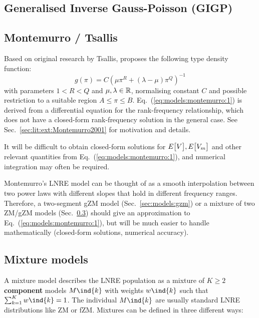 \documentclass[a4paper]{article}
\begin{document}
\subsection{Generalised Inverse Gauss-Poisson (GIGP)}
\label{sec:models:gigp}

\subsection{Montemurro / Tsallis}
\label{sec:models:montemurro}

Based on original research by Tsallis,  \citet{Montemurro:01} proposes the following type density function:
\begin{equation}
  \label{eq:models:montemurro:1}
  g(\pi) = C \left( \mu \pi^R + (\lambda - \mu) \pi^Q  \right)^{-1}
\end{equation}
with parameters $1 < R < Q$ and $\mu, \lambda\in \mathbb{R}$, normalising constant $C$ and possible restriction to a suitable region $A\leq \pi\leq B$.  Eq.~(\ref{eq:models:montemurro:1}) is derived from a differential equation for the rank-frequency relationship, which does not have a closed-form rank-frequency solution in the general case.  See Sec.~\ref{sec:lit:ext:Montemurro2001} for motivation and details.

It will be difficult to obtain closed-form solutions for $E_{}\bigl[V\bigr], E_{}\bigl[V_m\bigr]$ and other relevant quantities from Eq.~(\ref{eq:models:montemurro:1}), and numerical integration may often be required.

Montemurro's LNRE model can be thought of as a smooth interpolation between two power laws with different slopes that hold in different frequency ranges.  Therefore, a two-segment gZM model (Sec.~\ref{sec:models:gzm}) or a mixture of two ZM/gZM models (Sec.~\ref{sec:models:mixtures}) should give an approximation to Eq.~(\ref{eq:models:montemurro:1}), but will be much easier to handle mathematically (closed-form solutions, numerical accuracy).


\subsection{Mixture models}
\label{sec:models:mixtures}

A mixture model describes the LNRE population as a mixture of $K\geq 2$
\textbf{component} models $M\ind{k}$ with weights $w\ind{k}$ such that
$\sum_{k=1}^K w\ind{k} = 1$.  The individual $M\ind{k}$ are usually standard LNRE
distributions like ZM or fZM.  Mixtures can be defined in three different
ways:
\end{document}
